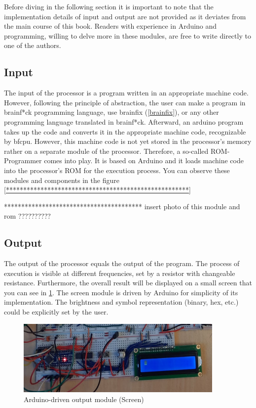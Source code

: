 Before diving in the following section it is important to note that the implementation details of input and output are not provided as it deviates from the main course of this book. Readers with experience in Arduino and programming, willing to delve more in these modules, are free to write directly to one of the authors.

\subsection{Input} \label{sec:implementation:input}
The input of the processor is a program written in an appropriate machine code. However, following the principle of abstraction, the user can make a program in brainf*ck programming language, use brainfix (\ref{brainfix}), or any other programming language translated in brainf*ck. Afterward, an arduino program takes up the code and converts it in the appropriate machine code, recognizable by bfcpu. However, this machine code is not yet stored in the processor's memory rather on a separate module of the processor. Therefore, a so-called ROM-Programmer comes into play. It is based on Arduino and it loads machine code into the processor's ROM for the execution process. You can observe these modules and components in the figure \ref{*****************************************************}

**************************************** insert photo of this module and rom ??????????

\subsection{Output} \label{sec:implementation:output}
The output of the processor equals the output of the program. The process of execution is visible at different frequencies, set by a resistor with changeable resistance. Furthermore, the overall result will be displayed on a small screen that you can see in \ref{fig:output:screen_module}. The screen module is driven by Arduino for simplicity of its implementation. The brightness and symbol representation (binary, hex, etc.) could be explicitly set by the user.

\begin{figure}[H]
	\centering
	\includegraphics[width=0.9\textwidth]{img/screen}
	\caption{Arduino-driven output module (Screen)}
	\label{fig:output:screen_module}
\end{figure}
